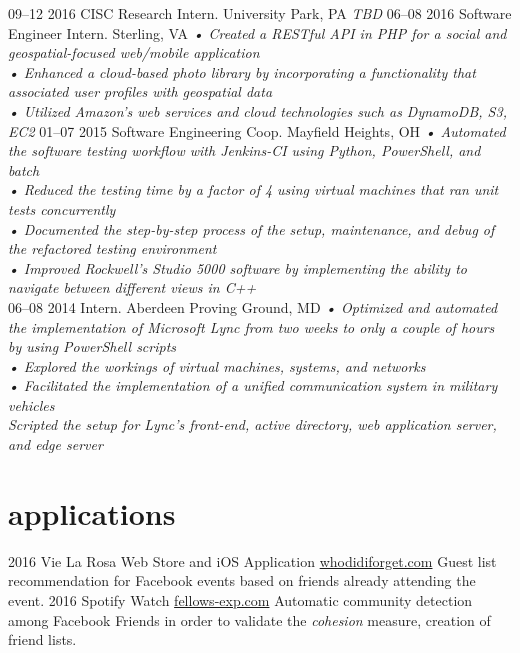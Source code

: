 \documentclass[]{friggeri-cv}
\begin{document}
\begin{entrylist}
  \entry
    {09–12 2016}
    {CISC Research Intern.}
    {University Park, PA}
    {\emph{
 	  TBD
    }}
  \entry
    {06–08 2016}
    {Software Engineer Intern.}
    {Sterling, VA}
    {\emph{
    •	Created a RESTful API in PHP for a social and geospatial-focused web/mobile application \\
	•	Enhanced a cloud-based photo library by incorporating a functionality that associated user profiles with geospatial data \\
	•	Utilized Amazon’s web services and cloud technologies such as DynamoDB, S3, EC2
    }}
  \entry
    {01–07 2015}
    {Software Engineering Coop.}
    {Mayfield Heights, OH}
    {\emph{
    •	Automated the software testing workflow with Jenkins-CI using Python, PowerShell, and batch \\
	•	Reduced the testing time by a factor of 4 using virtual machines that ran unit tests concurrently \\
	•	Documented the step-by-step process of the setup, maintenance, and debug of the refactored testing environment \\
	•	Improved Rockwell’s Studio 5000 software by implementing the ability to navigate between different views in C++ \\
    }}
  \entry
    {06–08 2014}
    {Intern.}
    {Aberdeen Proving Ground, MD}
    {\emph{
    •	Optimized and automated the implementation of Microsoft Lync from two weeks to only a couple of hours by using PowerShell scripts \\
	•	Explored the workings of virtual machines, systems, and networks \\
	•	Facilitated the implementation of a unified communication system in military vehicles \\
Scripted the setup for Lync’s front-end, active directory, web application server, and edge server
    }}
  \end{entrylist}

\break
\section{applications}

\begin{entrylist}
  \entry
    {2016}
    {Vie La Rosa Web Store and iOS Application}
    {\href{http://whodidiforget.com}{whodidiforget.com}}
    {Guest list recommendation for Facebook events based on friends already attending the event.}
  \entry
    {2016}
    {Spotify Watch}
    {\href{http://fellows-exp.com}{fellows-exp.com}}
    {Automatic community detection among Facebook Friends in order to validate the \emph{cohesion} measure, creation of friend lists.}
\end{entrylist}
\end{document}
